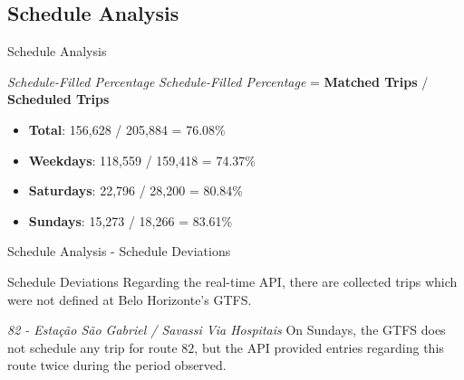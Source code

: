 \documentclass[xcolor=dvipsnames,table]{beamer}
\begin{document}
\subsection{Schedule Analysis}
\begin{frame}{Schedule Analysis}
        \begin{block}{\textit{Schedule-Filled Percentage}}
                \textit{Schedule-Filled Percentage} = \textbf{Matched Trips} / \textbf{Scheduled Trips}
                \begin{itemize}
                        \item \textbf{Total}: 156,628 / 205,884 = 76.08\% 
                        \item \textbf{Weekdays}: 118,559 / 159,418 = 74.37\% 
                        \item \textbf{Saturdays}: 22,796 / 28,200 = 80.84\% 
                        \item \textbf{Sundays}: 15,273 / 18,266 = 83.61\% 
                \end{itemize}
        \end{block}
\end{frame}
\begin{frame}{Schedule Analysis - Schedule Deviations}
        \begin{block}{Schedule Deviations}
                Regarding the real-time API, there are collected trips which were not defined at Belo Horizonte's GTFS.
        \end{block}
        \begin{block}{\textit{82 - Estação São Gabriel / Savassi Via Hospitais}}
                On Sundays, the GTFS does not schedule any trip for route $82$,
                but the API provided
                entries regarding this route twice during the period observed.
        \end{block}
\end{frame}
\end{document}
